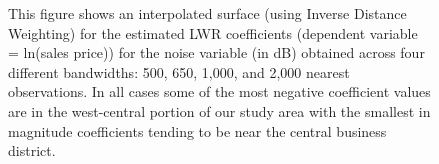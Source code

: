 \documentclass{article}\usepackage{graphicx, color}
\begin{document}
\begin{figure}
 \caption{This figure shows an interpolated surface (using Inverse Distance Weighting) for the estimated LWR coefficients (dependent variable = ln(sales price)) for the noise variable (in dB) obtained across four different bandwidths: 500, 650, 1,000, and 2,000 nearest observations. In all cases some of the most negative coefficient values are in the west-central portion of our study area with the smallest in magnitude coefficients tending to be near the central business district.}
 \label{fig:NoiseBetas}
\end{figure}
\end{document}
